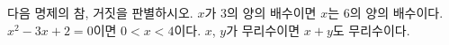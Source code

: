 다음 명제의 참, 거짓을 판별하시오. 
 $x$가 $3$의 양의 배수이면 $x$는 $6$의 양의 배수이다.
 $x^2-3x+2=0$이면 $0<x<4$이다.
 $x$, $y$가 무리수이면 $x+y$도 무리수이다.
